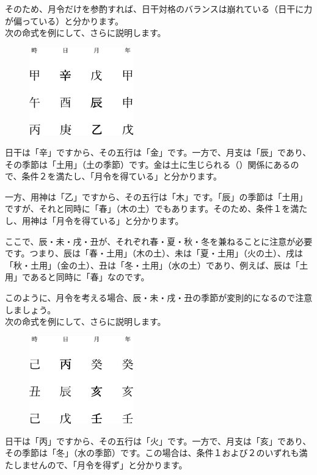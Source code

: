 \documentclass[a5paper,11pt,dvipdfmx]{tarticle}
\begin{document}
そのため、月令だけを参酌すれば、日干対格のバランスは崩れている（日干に力が偏っている）と分かります。\\

次の命式を例にして、さらに説明します。

\begin{figure}[h]
  \includegraphics[width=45mm,angle=90]{figs/figure6-2.eps}
\end{figure}

日干は「辛」ですから、その五行は「金」です。一方で、月支は「辰」であり、その季節は「土用」（土の季節）です。金は土に生じられる（）関係にあるので、条件２を満たし、「月令を得ている」と分かります。

一方、用神は「乙」ですから、その五行は「木」です。「辰」の季節は「土用」ですが、それと同時に「春」（木の土）でもあります。そのため、条件１を満たし、用神は「月令を得ている」と分かります。

ここで、辰・未・戌・丑が、それぞれ春・夏・秋・冬を兼ねることに注意が必要です。つまり、辰は「春・土用」（木の土）、未は「夏・土用」（火の土）、戌は「秋・土用」（金の土）、丑は「冬・土用」（水の土）であり、例えば、辰は「土用」であると同時に「春」なのです。

このように、月令を考える場合、辰・未・戌・丑の季節が変則的になるので注意しましょう。\\

次の命式を例にして、さらに説明します。

\begin{figure}[h]
  \includegraphics[width=45mm,angle=90]{figs/figure6-3.eps}
\end{figure}

日干は「丙」ですから、その五行は「火」です。一方で、月支は「亥」であり、その季節は「冬」（水の季節）です。この場合は、条件１および２のいずれも満たしませんので、「月令を得ず」と分かります。
\end{document}
